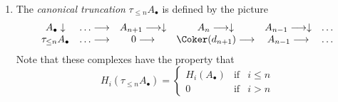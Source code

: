 \begin{enumerate}
$$$$
Note that these complexes have the property that
$$
H_i(\tau_{\geq n}A_\bullet) =
\left\{
\begin{matrix}
H_i(A_\bullet) & \text{if} & i \geq n \\
0 & \text{if} & i < n
\end{matrix}
\right.
$$
\item The {\it canonical truncation} $\tau_{\leq n}A_\bullet$
is defined by the picture
$$
\begin{array}{cccccc}A_\bullet \downarrow & \ldots \longrightarrow & A_{n + 1} \longrightarrow\downarrow & A_n \longrightarrow\downarrow & A_{n - 1} \longrightarrow\downarrow & \ldots \\ \tau_{\leq n}A_\bullet & \ldots \longrightarrow & 0 \longrightarrow & \Coker(d_{n + 1}) \longrightarrow & A_{n - 1} \longrightarrow & \ldots\end{array}
$$
Note that these complexes have the property that
$$
H_i(\tau_{\leq n}A_\bullet) =
\left\{
\begin{matrix}
H_i(A_\bullet) & \text{if} & i \leq n \\
0 & \text{if} & i > n
\end{matrix}
\right.
$$
\end{enumerate}

